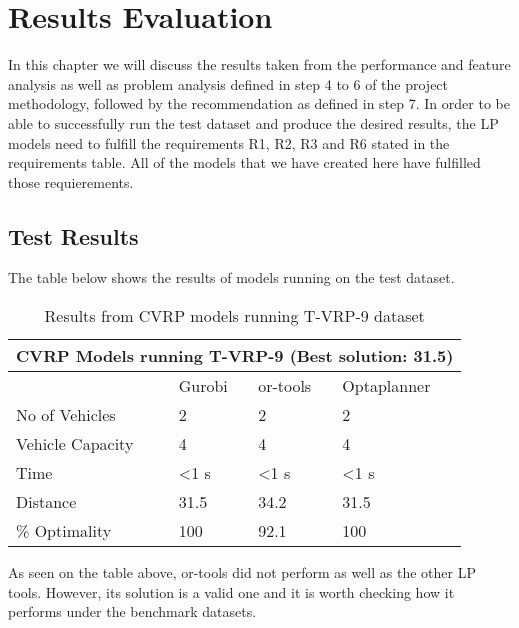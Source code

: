 \chapter{Results Evaluation}
In this chapter we will discuss the results taken from the performance and feature analysis as well as problem analysis
defined in step 4 to 6 of the project methodology, followed by the recommendation as defined in step 7. In order to
be able to successfully run the test dataset and produce the desired results,
the LP models need to fulfill the requirements R1, R2, R3 and R6 stated in the requirements table. All of the models
that we have created here have fulfilled those requierements.

\section{Test Results}
The table below shows the results of models running on the test dataset.
\vspace{0.5cm}
\begin{table}[!ht]
\centering
\begin{tabular}{|l|l|l|l|}
\hline
\multicolumn{4}{|c|}{CVRP Models running T-VRP-9 (Best solution: 31.5)} \\ \hline
              & Gurobi         & or-tools       & Optaplanner    \\ \hline
No of Vehicles & 2               & 2              & 2             \\ \hline
Vehicle Capacity & 4               & 4              & 4             \\ \hline
Time          & \textless 1 s  & \textless 1 s  & \textless 1 s  \\ \hline
Distance      & 31.5           & 34.2           & 31.5           \\ \hline
\% Optimality & 100            & 92.1           & 100          \\ \hline
\end{tabular}
\caption{Results from CVRP models running T-VRP-9 dataset}
\label{test-table}
\end{table}

As seen on the table above, or-tools did not perform as well as the other LP tools. However, its solution is a valid one
and it is worth checking how it performs under the benchmark datasets.

